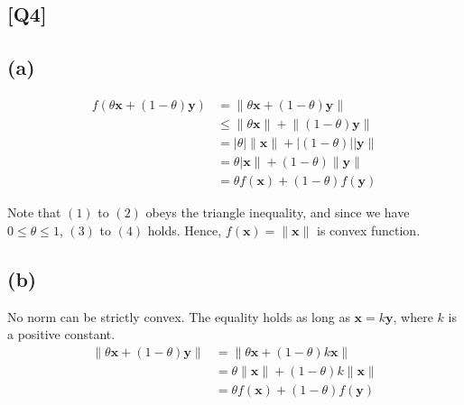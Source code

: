 \documentclass[12pt, a4 paper]{article}
\begin{document}
    \begin{framed}
    \section{[Q4]}
    \subsection{(a)}
        \begin{align}
        f(\theta \boldsymbol{x} + (1-\theta) \boldsymbol{y}) 
        &= \lVert \theta \boldsymbol{x} + (1-\theta) \boldsymbol{y} \rVert \\
        &\leq \lVert \theta \boldsymbol{x} \rVert + \lVert (1-\theta) \boldsymbol{y} \rVert \\
        &= \left| \theta \right| \lVert \boldsymbol{x} \rVert + \left| (1-\theta) \right| \lvert
        \boldsymbol{y} \rVert \\
        &= \theta \lvert \boldsymbol{x} \rVert + (1-\theta) \lVert \boldsymbol{y} \rVert \\
        &= \theta f(\boldsymbol{x}) + (1 - \theta) f(\boldsymbol{y})
        \end{align}

        Note that $(1)$ to $(2)$ obeys the triangle inequality, and since we have 
    $0 \leq \theta \leq 1$, $(3)$ to $(4)$ holds.
        Hence, $f(\boldsymbol{x}) = \lVert \boldsymbol{x} \rVert$ is convex function.

    \subsection{(b)}
        No norm can be strictly convex.
        The equality holds as long as $ \boldsymbol{x} = k \boldsymbol{y} $, where
         $k$ is a positive constant.
        \begin{align}
            \lVert \theta \boldsymbol{x} + (1-\theta) \boldsymbol{y} \rVert &= 
            \lVert \theta \boldsymbol{x} + (1-\theta) k \boldsymbol{x} \rVert\\
            &= \theta \lVert \boldsymbol{x} \rVert + (1-\theta) k \lVert \boldsymbol{x} \rVert\\
            &= \theta f(\boldsymbol{x}) + (1-\theta) f(\boldsymbol{y})
        \end{align}
    \end{framed}
\end{document}
